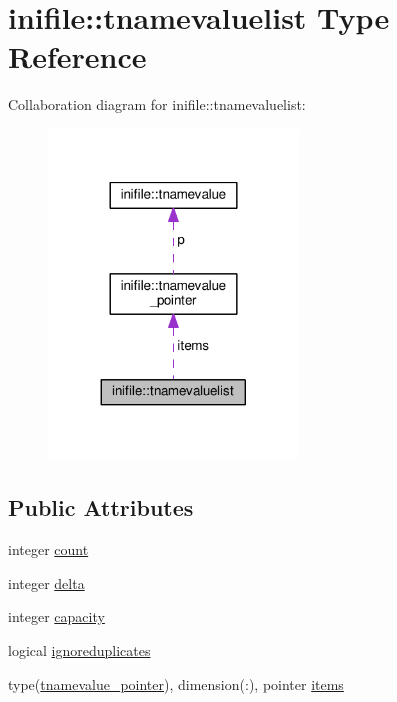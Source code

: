\hypertarget{structinifile_1_1tnamevaluelist}{}\section{inifile\+:\+:tnamevaluelist Type Reference}
\label{structinifile_1_1tnamevaluelist}


Collaboration diagram for inifile\+:\+:tnamevaluelist\+:
\nopagebreak
\begin{figure}[H]
\begin{center}
\leavevmode
\includegraphics[width=188pt]{structinifile_1_1tnamevaluelist__coll__graph}
\end{center}
\end{figure}
\subsection*{Public Attributes}
\begin{DoxyCompactItemize}
\item 
integer \mbox{\hyperlink{structinifile_1_1tnamevaluelist_a84c8d2a7de83fb01f54bea44e6549711}{count}}
\item 
integer \mbox{\hyperlink{structinifile_1_1tnamevaluelist_a90a012546dad616ac6660b9a89975232}{delta}}
\item 
integer \mbox{\hyperlink{structinifile_1_1tnamevaluelist_ab3db5a3d5f2c9456c8607afb69309cf3}{capacity}}
\item 
logical \mbox{\hyperlink{structinifile_1_1tnamevaluelist_ab405d770175a68a91b50ac81a05ba836}{ignoreduplicates}}
\item 
type(\mbox{\hyperlink{structinifile_1_1tnamevalue__pointer}{tnamevalue\+\_\+pointer}}), dimension(\+:), pointer \mbox{\hyperlink{structinifile_1_1tnamevaluelist_aa8ff02d56d12795312f87aec08f1e40d}{items}}
\end{DoxyCompactItemize}


